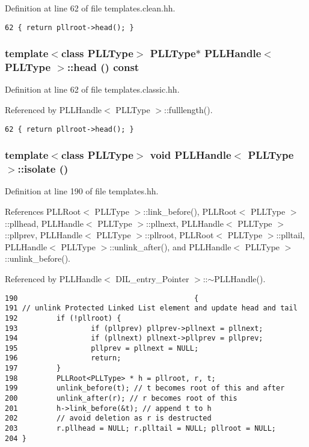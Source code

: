 Definition at line 62 of file templates.clean.hh.



\footnotesize\begin{verbatim}62 { return pllroot->head(); } 
\end{verbatim}\normalsize 
{}
\subsubsection{\setlength{\rightskip}{0pt plus 5cm}template$<$class PLLType$>$ {\bf PLLType}$\ast$ PLLHandle$<$ {\bf PLLType} $>$::head () const\hspace{0.3cm}{\tt  [inline]}}\label{classPLLHandle_a3}




Definition at line 62 of file templates.classic.hh.

Referenced by PLLHandle$<$ PLLType $>$::fulllength().



\footnotesize\begin{verbatim}62 { return pllroot->head(); } 
\end{verbatim}\normalsize 
{}
\subsubsection{\setlength{\rightskip}{0pt plus 5cm}template$<$class PLLType$>$ void PLLHandle$<$ {\bf PLLType} $>$::isolate ()\hspace{0.3cm}{\tt  [inline, protected]}}\label{classPLLHandle_b6}




Definition at line 190 of file templates.hh.

References PLLRoot$<$ PLLType $>$::link\_\-before(), PLLRoot$<$ PLLType $>$::pllhead, PLLHandle$<$ PLLType $>$::pllnext, PLLHandle$<$ PLLType $>$::pllprev, PLLHandle$<$ PLLType $>$::pllroot, PLLRoot$<$ PLLType $>$::plltail, PLLHandle$<$ PLLType $>$::unlink\_\-after(), and PLLHandle$<$ PLLType $>$::unlink\_\-before().

Referenced by PLLHandle$<$ DIL\_\-entry\_\-Pointer $>$::$\sim$PLLHandle().



\footnotesize\begin{verbatim}190                                         { 
191 // unlink Protected Linked List element and update head and tail
192         if (!pllroot) { 
193                 if (pllprev) pllprev->pllnext = pllnext; 
194                 if (pllnext) pllnext->pllprev = pllprev;
195                 pllprev = pllnext = NULL;
196                 return;
197         } 
198         PLLRoot<PLLType> * h = pllroot, r, t; 
199         unlink_before(t); // t becomes root of this and after
200         unlink_after(r); // r becomes root of this
201         h->link_before(&t); // append t to h
202         // avoid deletion as r is destructed
203         r.pllhead = NULL; r.plltail = NULL; pllroot = NULL;
204 } 
\end{verbatim}\normalsize 
{}
